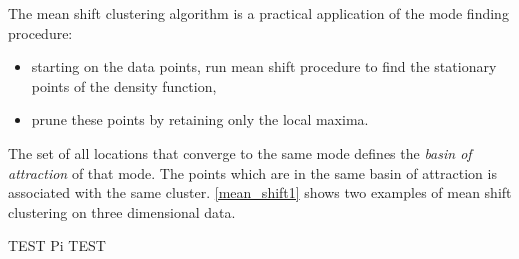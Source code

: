 The mean shift clustering algorithm is a practical application of the mode
finding procedure:
\begin{itemize}
	\item starting on the data points, run mean shift procedure to find the 
	stationary points of the density function,
	\item prune these points by retaining only the local maxima.
\end{itemize}

The set of all locations that converge to the same mode defines the \emph{basin of attraction} of that mode. The points which are in the same basin of 
attraction is associated with the same cluster. \ref{mean_shift1} shows two examples of mean shift clustering on three dimensional data.

TEST \gls{Pi} TEST

